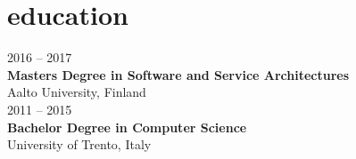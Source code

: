\documentclass[]{friggeri-cv}
\begin{document}

\section{education}

{2016 -- 2017} \\
\textbf{Masters Degree {\normalfont in Software and Service Architectures}} \\
{Aalto University, Finland} \\

{2011 -- 2015} \\
\textbf{Bachelor Degree {\normalfont in Computer Science}} \\
{University of Trento, Italy}
\end{document}

